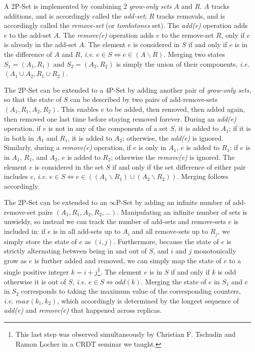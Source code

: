 \documentclass[11pt, oneside]{article}   	%
\begin{document}
A 2P-Set is implemented by combining 2 \textit{grow-only sets} $A$ and $R$. $A$ tracks additions, and is accordingly called the \textit{add-set}; $R$ tracks removals, and is accordingly called the \textit{remove-set} (or \textit{tombstones} set). The \textit{add(e)} operation adds $e$ to the add-set $A$. The \textit{remove(e)} operation adds $e$ to the remove-set $R$, only if $e$ is already in the add-set $A$. The element $e$ is considered in $S$ if and only if $e$ is in the difference of $A$ and $R$, \textit{i.e.} $e \in S \Leftrightarrow e \in (A\backslash R)$. Merging two states $S_1 = (A_1, R_1)$ and $S_2 = (A_2, R_2)$ is simply the union of their components, \textit{i.e.} $(A_1 \cup A_2, R_1 \cup R_2)$.

The 2P-Set can be extended to a 4P-Set by adding another pair of \textit{grow-only sets}, so that the state of $S$ can be described by two pairs of add-remove-sets $(A_1,R_1,A_2,R_2)$.  This enables $e$ to be added, then removed, then added again, then removed one last time before staying removed forever. During an \textit{add(e)} operation, if $e$ is not in any of the components of a set $S$, it is added to $A_1$; if it is in both in $A_1$ and $R_1$, it is added to $A_2$; otherwise, the \textit{add(e)} is ignored. Similarly, during a \textit{remove(e)} operation, if $e$ is only in $A_1$, $e$ is added to $R_1$; if $e$ is in $A_1$, $R_1$, and $A_2$, $e$ is added to $R_2$; otherwise the \textit{remove(e)} is ignored. The element $e$ is considered in the set $S$ if and only if the set difference of either pair includes $e$, \textit{i.e.} $e \in S \Leftrightarrow e \in  ((A_1 \backslash R_1) \cup (A_2 \backslash R_2))$. Merging follows accordingly.

The 2P-Set can be extended to an $\infty$P-Set by adding an infinite number of add-remove-set pairs $(A_1, R_1, A_2, R_2, \dots)$. Manipulating an infinite number of sets is unwieldy, so instead we can track the number of add-sets and remove-sets 
$e$ is included in: if $e$ is in all add-sets up to $A_i$ and all remove-sets up to $R_{j}$, we simply store the state of $e$ as $(i, j)$. Furthermore, because the state of $e$ is strictly alternating between being in and out of $S$, and $i$ and $j$ monotonically grow as $e$ is further added and removed, we can simply map the state of $e$ to a single positive integer $k=i+j$\footnote{This last step was observed simultaneously by Christian F. Tschudin and Ramon Locher in a CRDT seminar we taught.}. The element $e$ is in $S$ if and only if $k$ is odd otherwise it is out of $S$, \textit{i.e.} $e \in S \Leftrightarrow odd(k)$. Merging the state of $e$ in $S_1$ and $e$ in $S_2$ corresponds to taking the maximum value of the corresponding counters, \textit{i.e.} $\textit{max}(k_1, k_2)$, which accordingly is determined by the longest sequence of \textit{add(e)} and \textit{remove(e)} that happened across replicas. 
\end{document}
